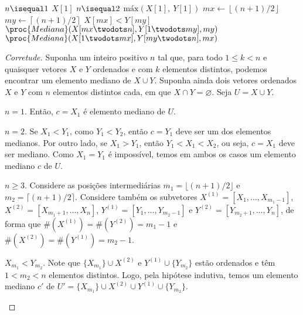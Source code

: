 
\begin{codebox}
    \li \If $n \isequal 1$
        \Then
    \li     \Return $X[1]$
    \li \ElseIf $n \isequal 2$
        \Then
    \li     \Return $\text{máx}(X[1],~ Y[1])$
    \li \ElseNoIf
    \li     $mx \gets \left\lfloor(n + 1) / 2\right\rfloor$
    \li     $my \gets \left\lceil(n + 1) / 2\right\rceil$
    \li     \If $X[mx] < Y[my]$
            \Then
    \li         \Return $\proc{Mediana}(X[mx \twodots n], Y[1 \twodots my], my)$
    \li     \Else
    \li         \Return $\proc{Mediana}(X[1 \twodots mx], Y[my \twodots n], mx)$
            \End
        \End
\end{codebox}

\begin{proof}[Corretude]
    Suponha um inteiro positivo $n$ tal que, para todo $1 \leq k < n$ e quaisquer vetores $X$ e $Y$ ordenados e com $k$ elementos distintos, podemos encontrar um elemento mediano de $X \cup Y$. Suponha ainda dois vetores ordenados $X$ e $Y$ com $n$ elementos distintos cada, em que $X \cap Y = \varnothing$. Seja $U = X \cup Y$.

    \begin{casos}
        \item $n = 1$. Então, $c = X_1$ é elemento mediano de $U$.

        \item $n = 2$. Se $X_1 < Y_1$, como $Y_1 < Y_2$, então $c = Y_1$ deve ser um dos elementos medianos. Por outro lado, se $X_1 > Y_1$, então $Y_1 < X_1 < X_2$, ou seja, $c = X_1$ deve ser mediano. Como $X_1 = Y_1$ é impossível, temos em ambos os casos um elemento mediano $c$ de $U$.

        \item $n \geq 3$. Considere as posições intermediárias $m_1 = \lfloor (n + 1) / 2 \rfloor$ e $m_2 = \lceil (n + 1) / 2 \rceil$. Considere também os subvetores $X^{(1)} = [X_1, \ldots, X_{m_1 - 1}]$, $X^{(2)} = [X_{m_1 + 1}, \ldots, X_n]$, $Y^{(1)} = [Y_1, \ldots, Y_{m_2 - 1}]$ e $Y^{(2)} = [Y_{m_2 + 1}, \ldots, Y_n]$, de forma que $\#(X^{(1)}) = \#(Y^{(2)}) = m_1 - 1$ e $\#(X^{(2)}) = \#(Y^{(1)}) = m_2 - 1$.

        \begin{casos}
            \item $X_{m_1} < Y_{m_2}$. Note que $\{X_{m_1}\} \cup X^{(2)}$ e $Y^{(1)} \cup \{Y_{m_2}\}$ estão ordenados e têm $1 < m_2 < n$ elementos distintos. Logo, pela hipótese indutiva, temos um elemento mediano $c'$ de $U' = \{X_{m_1}\} \cup X^{(2)} \cup Y^{(1)} \cup \{Y_{m_2}\}$.


\end{casos}
\end{casos}
\end{proof}
